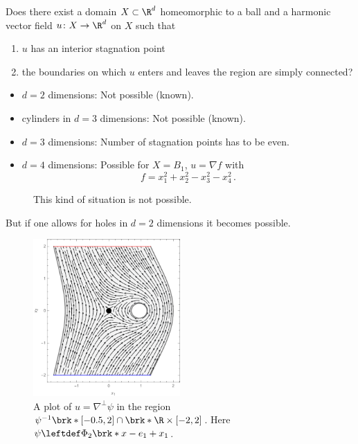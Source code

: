 \begin{frame}
	\begin{question} \label{qu:flowthroughStagnationPoint}
		Does there exist a domain $X\subset\R^d$ homeomorphic to a ball and a harmonic vector field $u\colon X\to\R^d$ on $X$ such that
		\begin{enumerate}
		  \item $u$ has an interior stagnation point
		  \item the boundaries on which $u$ enters and leaves the region are simply connected?
		\end{enumerate}
	\end{question}
  \begin{answer}
  \begin{itemize}
    \item $d=2$ dimensions: Not possible (known).
    \item cylinders in $d=3$ dimensions: Not possible (known).
    \item $d=3$ dimensions: Number of stagnation points has to be even.
    \item $d=4$ dimensions: Possible for $X=B_1$, $u=\nabla f$ with $$f=x_1^2+x_2^2-x_3^2-x_4^2\,.$$
  \end{itemize}
\end{answer}
\end{frame}

\begin{frame}
  \begin{figure}
    \centering
    
    \caption{This kind of situation is not possible.}
    \label{fi:n3_cylinder}
  \end{figure}
\end{frame}

\begin{frame}
  But if one allows for holes in $d=2$ dimensions it becomes possible.
  \begin{figure}
    \centering
    \includegraphics[width=0.5\textwidth]{../Plots/n2_hvf_InflowOutflow_asymmetric_gray_2.pdf}
    \caption{A plot of $u=\nabla^\perp\psi$ in the region $\psi^{-1}\brk*{[-0.5,2]}\cap \brk*{\R\times[-2,2]}$.
    Here $\psi\leftdef\Phi_2\brk*{x-e_1}+x_1$.}
    \label{pl:n2_hvf_InflowOutflow_asymmetric_single}
  \end{figure}
\end{frame}

